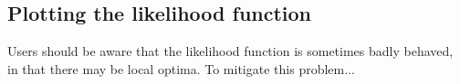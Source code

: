 \documentclass[article]{jss}
\begin{document}



%
% 
%

\subsection{Plotting the likelihood function} \label{sec:extensions}



Users should be aware that the likelihood function is sometimes badly behaved, in that there may be local optima. To mitigate this problem...
\end{document}
